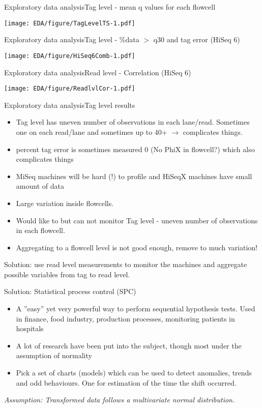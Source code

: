 \documentclass[11pt]{beamer}
\begin{document}
\begin{frame}{Exploratory data analysis}{Tag level - mean q values for each flowcell} 
\begin{center}
\texttt{[image: EDA/figure/TagLevelTS-1.pdf]} 
\end{center}
\end{frame}

\begin{frame}{Exploratory data analysis}{Tag level - \%data $>$ q30 and  tag error (HiSeq 6)}
\begin{center}
\texttt{[image: EDA/figure/HiSeq6Comb-1.pdf]} 
\end{center}
\end{frame}

\begin{frame}{Exploratory data analysis}{Read level - Correlation (HiSeq 6)}
\begin{center}
\texttt{[image: EDA/figure/ReadlvlCor-1.pdf]} 
\end{center}
\end{frame}

\begin{frame}{Exploratory data analysis}{Tag level results}
\begin{itemize}
\item Tag level has uneven number of observations in each lane/read. Sometimes one on each read/lane and sometimes up to 40+ $\rightarrow$ complicates things.
\item percent tag error is sometimes measured 0 (No PhiX in flowcell?) which also complicates things 
\item MiSeq machines will be hard (!) to profile and HiSeqX machines have small amount of data
\item Large variation inside flowcells.
\item Would like to but can not monitor Tag level -  uneven number of observations in each flowcell.
\item Aggregating to a flowcell level is not good enough, remove to much variation!
\end{itemize}
Solution: use read level measurements to monitor the machines and aggregate possible variables from tag to read level.
\end{frame}

\begin{frame}{Solution: Statistical process control (SPC)}
\begin{itemize}
\item A ''easy'' yet very powerful way to perform sequential hypothesis tests. Used in finance, food industry, production processes, monitoring patients in hospitals  
\item A lot of research have been put into the subject, though most under the assumption of normality
\item Pick a set of charts (models) which can be used to detect anomalies, trends and odd behaviours. One for estimation of the time the shift occurred.
\end{itemize}
\textit{Assumption: Transformed data follows a multivariate normal distribution.}
\end{frame}
\end{document}

